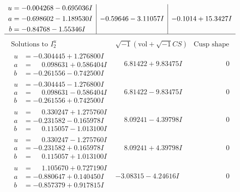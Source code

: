 \documentclass[1p]{elsarticle_modified}
\theoremstyle{definition}
\newcommand{\I}{\sqrt{-1}}
\begin{document}
$$\begin{array}{c|c|c}
\begin{aligned}
u &= -0.004268 - 0.695036 I \\
a &= -0.698602 - 1.189530 I \\
b &= -0.84768 - 1.55346 I\end{aligned}
 & -0.59646 - 3.11057 I & -0.1014 + 15.3427 I\\
 \hline 
 \end{array}$$\newpage$$\begin{array}{c|c|c}  
\text{Solutions to }I^u_{2}& \I (\text{vol} + \sqrt{-1}CS) & \text{Cusp shape}\\
 \hline 
\begin{aligned}
u &= -0.304445 + 1.276800 I \\
a &= \phantom{-}0.098631 + 0.586404 I \\
b &= -0.261556 - 0.742500 I\end{aligned}
 & \phantom{-}6.81422 + 9.83475 I & \phantom{-0.000000 } 0 \\ \hline\begin{aligned}
u &= -0.304445 - 1.276800 I \\
a &= \phantom{-}0.098631 - 0.586404 I \\
b &= -0.261556 + 0.742500 I\end{aligned}
 & \phantom{-}6.81422 - 9.83475 I & \phantom{-0.000000 } 0 \\ \hline\begin{aligned}
u &= \phantom{-}0.330247 + 1.275760 I \\
a &= -0.231582 - 0.165978 I \\
b &= \phantom{-}0.115057 - 1.013100 I\end{aligned}
 & \phantom{-}8.09241 - 4.39798 I & \phantom{-0.000000 } 0 \\ \hline\begin{aligned}
u &= \phantom{-}0.330247 - 1.275760 I \\
a &= -0.231582 + 0.165978 I \\
b &= \phantom{-}0.115057 + 1.013100 I\end{aligned}
 & \phantom{-}8.09241 + 4.39798 I & \phantom{-0.000000 } 0 \\ \hline\begin{aligned}
u &= \phantom{-}1.105670 + 0.727190 I \\
a &= -0.880647 + 0.140450 I \\
b &= -0.857379 + 0.917815 I\end{aligned}
 & -3.08315 - 4.24616 I & \phantom{-0.000000 } 0 \\ \hline\begin{aligned}

\end{aligned}
\end{array}$$
\end{document}
